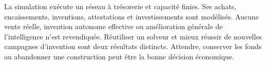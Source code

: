 \documentclass[
  10pt,
]{article}
\begin{document}
La simulation exécute un réseau à trésorerie et capacité finies. Ses
achats, encaissements, inventions, attestations et investissements sont
modélisés. Aucune vente réelle, invention autonome effective ou
amélioration générale de l'intelligence n'est revendiquée. Réutiliser un
solveur et mieux réussir de nouvelles campagnes d'invention sont deux
résultats distincts. Attendre, conserver les fonds ou abandonner une
construction peut être la bonne décision économique.
\end{document}
